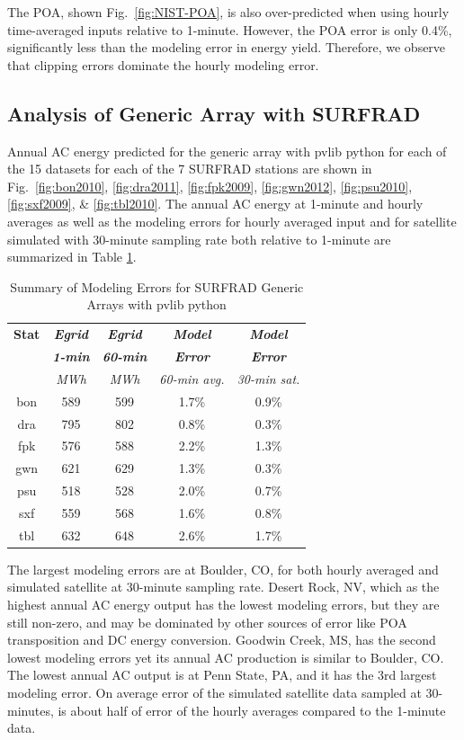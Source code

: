 \documentclass[conference]{IEEEtran}
\begin{document}
The POA, shown Fig.~\ref{fig:NIST-POA}, is also over-predicted when using hourly time-averaged inputs relative to 1-minute. However, the POA error is only 0.4\%, significantly less than the modeling error in energy yield. Therefore, we observe that clipping errors dominate the hourly modeling error.

\subsection{Analysis of Generic Array with SURFRAD}
Annual AC energy predicted for the generic array with pvlib python for each of the 15 datasets for each of the 7 SURFRAD stations are shown in Fig.~\ref{fig:bon2010}, \ref{fig:dra2011}, \ref{fig:fpk2009}, \ref{fig:gwn2012}, \ref{fig:psu2010}, \ref{fig:sxf2009}, \& \ref{fig:tbl2010}. The annual AC energy at 1-minute and hourly averages as well as the modeling errors for hourly averaged input and for satellite simulated with 30-minute sampling rate both relative to 1-minute are summarized in Table  \ref{table:SURFRAD-summary}.

\begin{table}[htbp]
\caption{Summary of Modeling Errors for SURFRAD Generic Arrays with pvlib python}
\begin{center}
\begin{tabular}{|c|c|c|c|c|}
\hline
\textbf{Stat} & \textbf{\textit{Egrid}}& \textbf{\textit{Egrid}}& \textbf{\textit{Model}}& \textbf{\textit{Model}} \\
              & \textbf{\textit{1-min}}& \textbf{\textit{60-min}}& \textbf{\textit{Error}}& \textbf{\textit{Error}} \\
                 & \textit{MWh}& \textit{MWh}& \textit{60-min avg.}& \textit{30-min sat.} \\
\hline
bon& 589& 599& 1.7\%& 0.9\% \\
dra& 795& 802& 0.8\%& 0.3\% \\
fpk& 576& 588& 2.2\%& 1.3\% \\
gwn& 621& 629& 1.3\%& 0.3\% \\
psu& 518& 528& 2.0\%& 0.7\% \\
sxf& 559& 568& 1.6\%& 0.8\% \\
tbl& 632& 648& 2.6\%& 1.7\% \\
\hline
\end{tabular}
\label{table:SURFRAD-summary}
\end{center}
\end{table}

The largest modeling errors are at Boulder, CO, for both hourly averaged and simulated satellite at 30-minute sampling rate. Desert Rock, NV, which as the highest annual AC energy output has the lowest modeling errors, but they are still non-zero, and may be dominated by other sources of error like POA transposition and DC energy conversion. Goodwin Creek, MS, has the second lowest modeling errors yet its annual AC production is similar to Boulder, CO. The lowest annual AC output is at Penn State, PA, and it has the 3rd largest modeling error. On average error of the simulated satellite data sampled at 30-minutes, is about half of error of the hourly averages compared to the 1-minute data.
\end{document}
